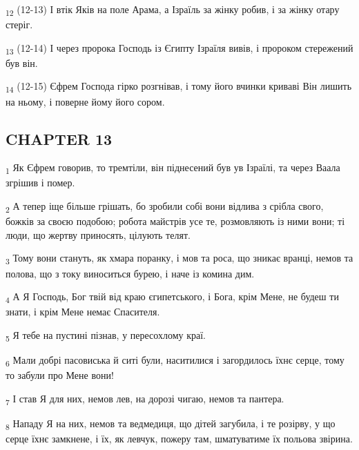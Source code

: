 \begin{tcolorbox}
\textsubscript{12} (12-13) І втік Яків на поле Арама, а Ізраїль за жінку робив, і за жінку отару стеріг.
\end{tcolorbox}
\begin{tcolorbox}
\textsubscript{13} (12-14) І через пророка Господь із Єгипту Ізраїля вивів, і пророком стережений був він.
\end{tcolorbox}
\begin{tcolorbox}
\textsubscript{14} (12-15) Єфрем Господа гірко розгнівав, і тому його вчинки криваві Він лишить на ньому, і поверне йому його сором.
\end{tcolorbox}
\subsection{CHAPTER 13}
\begin{tcolorbox}
\textsubscript{1} Як Єфрем говорив, то тремтіли, він піднесений був ув Ізраїлі, та через Ваала згрішив і помер.
\end{tcolorbox}
\begin{tcolorbox}
\textsubscript{2} А тепер іще більше грішать, бо зробили собі вони відлива з срібла свого, божків за своєю подобою; робота майстрів усе те, розмовляють із ними вони; ті люди, що жертву приносять, цілують телят.
\end{tcolorbox}
\begin{tcolorbox}
\textsubscript{3} Тому вони стануть, як хмара поранку, і мов та роса, що зникає вранці, немов та полова, що з току виноситься бурею, і наче із комина дим.
\end{tcolorbox}
\begin{tcolorbox}
\textsubscript{4} А Я Господь, Бог твій від краю єгипетського, і Бога, крім Мене, не будеш ти знати, і крім Мене немає Спасителя.
\end{tcolorbox}
\begin{tcolorbox}
\textsubscript{5} Я тебе на пустині пізнав, у пересохлому краї.
\end{tcolorbox}
\begin{tcolorbox}
\textsubscript{6} Мали добрі пасовиська й ситі були, наситилися і загордилось їхнє серце, тому то забули про Мене вони!
\end{tcolorbox}
\begin{tcolorbox}
\textsubscript{7} І став Я для них, немов лев, на дорозі чигаю, немов та пантера.
\end{tcolorbox}
\begin{tcolorbox}
\textsubscript{8} Нападу Я на них, немов та ведмедиця, що дітей загубила, і те розірву, у що серце їхнє замкнене, і їх, як левчук, пожеру там, шматуватиме їх польова звірина.
\end{tcolorbox}
